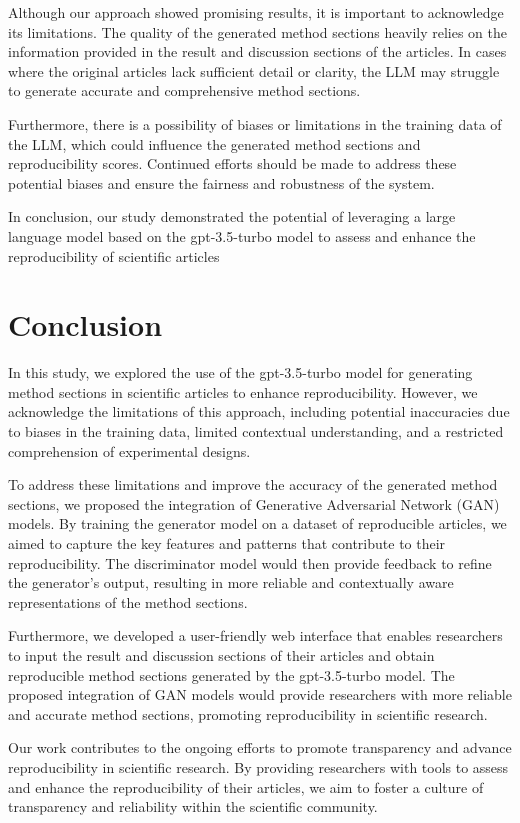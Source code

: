 \documentclass[12pt, a4paper, twocolumn]{article}
\begin{document}
		Although our approach showed promising results, it is important to acknowledge its limitations. The quality of the generated method sections heavily relies on the information provided in the result and discussion sections of the articles. In cases where the original articles lack sufficient detail or clarity, the LLM may struggle to generate accurate and comprehensive method sections.
		
		Furthermore, there is a possibility of biases or limitations in the training data of the LLM, which could influence the generated method sections and reproducibility scores. Continued efforts should be made to address these potential biases and ensure the fairness and robustness of the system.
		
		In conclusion, our study demonstrated the potential of leveraging a large language model based on the gpt-3.5-turbo model to assess and enhance the reproducibility of scientific articles

	\section{Conclusion}

	In this study, we explored the use of the gpt-3.5-turbo model for generating method sections in scientific articles to enhance reproducibility. However, we acknowledge the limitations of this approach, including potential inaccuracies due to biases in the training data, limited contextual understanding, and a restricted comprehension of experimental designs.

To address these limitations and improve the accuracy of the generated method sections, we proposed the integration of Generative Adversarial Network (GAN) models. By training the generator model on a dataset of reproducible articles, we aimed to capture the key features and patterns that contribute to their reproducibility. The discriminator model would then provide feedback to refine the generator's output, resulting in more reliable and contextually aware representations of the method sections.

Furthermore, we developed a user-friendly web interface that enables researchers to input the result and discussion sections of their articles and obtain reproducible method sections generated by the gpt-3.5-turbo model. The proposed integration of GAN models would provide researchers with more reliable and accurate method sections, promoting reproducibility in scientific research.

Our work contributes to the ongoing efforts to promote transparency and advance reproducibility in scientific research. By providing researchers with tools to assess and enhance the reproducibility of their articles, we aim to foster a culture of transparency and reliability within the scientific community.
\end{document}
